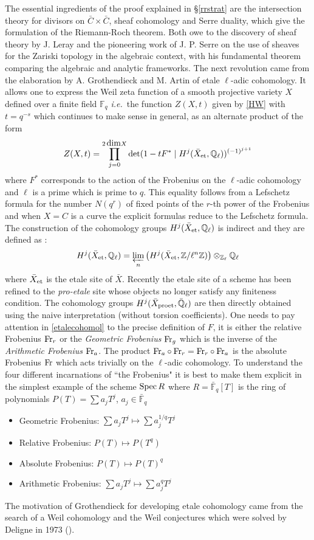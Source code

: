 \documentclass[12pt]{article}
\def\Spec{{\rm Spec\,}}
\def\F{{\mathbb F}}
\def\Q{{\mathbb Q}}
\def\Z{{\mathbb Z}}
\def\ett{{\rm et}}
\newcommand{\ie}{{\it i.e.\/}\ }
\def\dim{{\mbox{dim}}}
\def\fr{{\rm Fr}}
\begin{document}
The essential ingredients of the proof explained in \S \ref{rrstrat} are the intersection theory for divisors on $\bar C\times \bar C$, sheaf cohomology and Serre duality, which give the formulation of the Riemann-Roch theorem. Both  owe to the discovery of sheaf theory by J. Leray and the pioneering work of J. P. Serre on the use of sheaves for the Zariski topology in the algebraic context, with his fundamental theorem comparing the algebraic and analytic frameworks. The next revolution came from the elaboration by A. Grothendieck and M. Artin of etale $\ell$-adic cohomology. It allows one to express the Weil zeta function of a smooth projective variety $X$ defined over a finite field $\F_q$ \ie the function $Z(X,t)$ given by \eqref{HW} with $t=q^{-s}$ which continues to make sense in general, as an alternate product of the form
\begin{equation}\label{etalecohomol}
Z(X,t)=\prod_{j=0}^{2\, \dim X} \det(1-t F^*\mid H^j({\bar X}_\ett,\Q_\ell))^{(-1)^{j+1}}
\end{equation}
where $F^*$ corresponds to the action of the Frobenius on the $\ell$-adic cohomology and $\ell$ is a prime which is prime to $q$. This equality follows from a Lefschetz  formula for the number $N(q^r)$ of fixed points of the $r$-th power of the Frobenius and when $X=C$ is a curve the explicit formulas reduce to the Lefschetz formula. The construction of the cohomology groups $H^j(\bar X_{\ett},\Q_\ell)$ is indirect and they are defined as :
$$
H^j(\bar X_{\ett},\Q_\ell)=\varprojlim_n \left( H^j(\bar X_\ett,\Z/\ell^n\Z) \right)\otimes_{\Z_\ell}\Q_\ell
$$
where $\bar X_{\ett}$ is the etale site of $\bar X$. Recently the etale site of a scheme has been refined \cite{BS} to the {\em pro-etale} site whose objects   no longer satisfy any  finiteness condition. The cohomology groups $H^j(\bar X_{\rm proet},\bar\Q_\ell)$ are then directly obtained using the naive interpretation  (without torsion coefficients). 
One needs to pay attention in \eqref{etalecohomol} to the precise definition of $F$, it is either the relative Frobenius $\fr_r$ or the {\em Geometric Frobenius} $\fr_g$ which is the inverse of the {\em Arithmetic Frobenius} $\fr_a$. The product $\fr_a\circ \fr_r=\fr_r\circ \fr_a$ is the absolute Frobenius $\fr$ which acts trivially on the $\ell$-adic cohomology. To understand the four different incarnations of ``the Frobenius" it is best to make them explicit in the simplest example of the scheme $\Spec R$ where $R=\bar\F_q[T]$ is the ring of polynomials $P(T)=\sum a_j T^j$, $a_j\in \bar\F_q$
\begin{itemize}
\item Geometric Frobenius: $\sum a_j T^j\mapsto \sum a_j^{1/q} T^j$
\item Relative Frobenius: $P(T)\mapsto P(T^q)$
\item  Absolute Frobenius: $P(T)\mapsto P(T)^q$
\item  Arithmetic Frobenius: $\sum a_j T^j\mapsto \sum a_j^q T^j$
\end{itemize}
The motivation of Grothendieck for developing etale cohomology came from the search of a Weil cohomology and the Weil conjectures which were solved by Deligne in 1973 (\cite{Deligne}).
\end{document}
